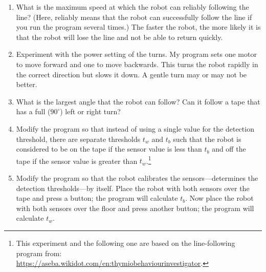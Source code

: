 
\begin{enumerate}

\item What is the maximum speed at which the robot can reliably
following the line? (Here, reliably means that the robot can
successfully follow the line if you run the program several times.) The
faster the robot, the more likely it is that the robot will lose the
line and not be able to return quickly.

\item Experiment with the power setting of the turns. My program sets
one motor to move forward and one to move backwards. This turns the
robot rapidly in the correct direction but slows it down. A gentle turn
may or may not be better.

\item What is the largest angle that the robot can follow? Can it follow
a tape that has a full ($90^\circ$) left or right turn?

\item Modify the program so that instead of using a single value for the
detection threshold, there are separate thresholds $t_w$ and $t_b$ such
that the robot is considered to be on the tape if the sensor value is
less than $t_b$ and off the tape if the sensor value is greater than
$t_w$.\footnote{This experiment and the following one are based on the
 line-following program from:\\
\url{https://aseba.wikidot.com/en:thymiobehaviourinvestigator}.}

\item Modify the program so that the robot calibrates the
sensors---determines the detection thresholds---by itself. Place the
robot with both sensors over the tape and press a button; the program
will calculate $t_b$. Now place the robot with both sensors over the
floor and press another button; the program will calculate $t_w$.

\end{enumerate}